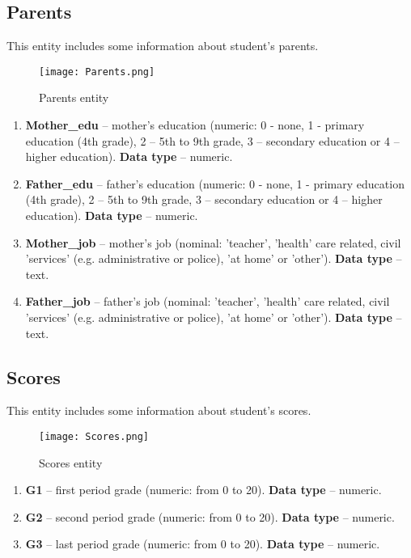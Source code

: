 \subsection*{Parents}

This entity includes some information about student's parents.

\begin{figure}[H]
    \centering
    \texttt{[image: Parents.png]}
    \caption{Parents entity}
\end{figure}

\begin{enumerate}
\item \textbf{Mother\_edu} -- mother's education (numeric: 0 - none, 1 - primary education (4th grade), 2 – 5th to 9th grade, 3 – secondary education or 4 – higher education). \textbf{Data type} -- numeric.
\item \textbf{Father\_edu} -- father's education (numeric: 0 - none, 1 - primary education (4th grade), 2 – 5th to 9th grade, 3 – secondary education or 4 – higher education). \textbf{Data type} -- numeric.
\item \textbf{Mother\_job} -- mother's job (nominal: 'teacher', 'health' care related, civil 'services' (e.g. administrative or police), 'at home' or 'other'). \textbf{Data type} -- text.
\item \textbf{Father\_job} -- father's job (nominal: 'teacher', 'health' care related, civil 'services' (e.g. administrative or police), 'at home' or 'other'). \textbf{Data type} -- text.
\end{enumerate}

\subsection*{Scores}

This entity includes some information about student's scores.

\begin{figure}[H]
    \centering
    \texttt{[image: Scores.png]}
    \caption{Scores entity}
\end{figure}

\begin{enumerate}
\item \textbf{G1} -- first period grade (numeric: from 0 to 20). \textbf{Data type} -- numeric.
\item \textbf{G2} -- second period grade (numeric: from 0 to 20). \textbf{Data type} -- numeric.
\item \textbf{G3} -- last period grade (numeric: from 0 to 20). \textbf{Data type} -- numeric.
\end{enumerate}

